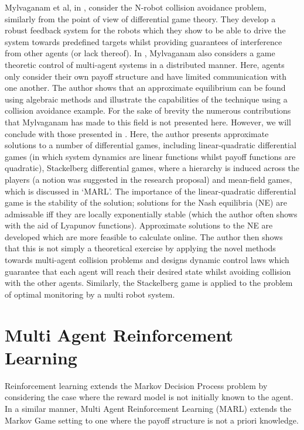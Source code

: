 \documentclass[.../main.tex]{subfiles}
\begin{document}
Mylvaganam et al, in \cite{Mylvaganam2017AutonomousApproach}, consider the N-robot collision
avoidance problem, similarly from the point of view of differential game theory. They develop a
robust feedback system for the robots which they show to be able to drive the system towards
predefined targets whilst providing guarantees of interference from other agents (or lack thereof).
In \cite{MylvaganamASystems}, Mylvaganam also considers a game theoretic control of multi-agent
systems in a distributed manner. Here, agents only consider their own payoff structure and have
limited communication with one another. The author shows that an approximate equilibrium can be
found using algebraic methods and illustrate the capabilities of the technique using a collision
avoidance example. For the sake of brevity the numerous contributions that Mylvaganam has made to
this field is not presented here. However, we will conclude with those presented in
\cite{Mylvaganam2014}. Here, the author presents approximate solutions to a number of differential
games, including linear-quadratic differential games (in which system dynamics are linear functions
whilst payoff functions are quadratic), Stackelberg differential games, where a hierarchy is 
induced across the players (a notion was suggested in the research proposal) and mean-field games,
which is discussed in `MARL'. The importance of the linear-quadratic
differential game is the stability of the solution; solutions for the Nash equilibria (NE) are
admissable iff they are locally exponentially stable (which the author often shows with the aid of
Lyapunov functions). Approximate solutions to the NE are developed which are more feasible to
calculate online. The author then shows that this is not simply a theoretical exercise by applying
the novel methods towards multi-agent collision problems and designs dynamic control laws which
guarantee that each agent will reach their desired state whilst avoiding collision with the other
agents. Similarly, the Stackelberg game is applied to the problem of optimal monitoring by a multi
robot system.   

\section{Multi Agent Reinforcement Learning} \label{sec::MARL}

Reinforcement learning extends the Markov Decision Process problem by considering the case where the
reward model is not initially known to the agent. In a similar manner, Multi Agent Reinforcement
Learning (MARL) extends the Markov Game setting to one where the payoff structure is not a priori
knowledge. 
\end{document}
